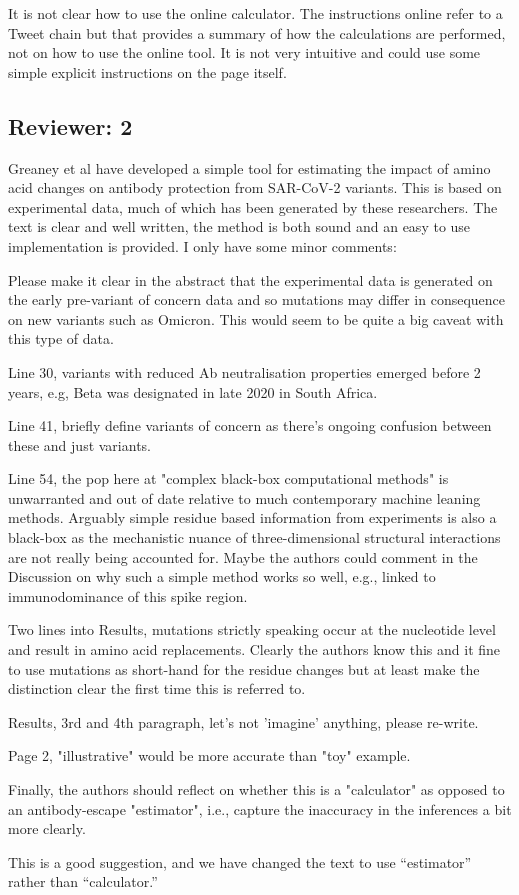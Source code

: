 \documentclass[11pt, oneside]{article}   	%
\newcommand{\response}[1]{{\color{black}#1}}
\begin{document}
It is not clear how to use the online calculator.  The instructions online refer to a Tweet chain but that provides a summary of how the calculations are performed, not on how to use the online tool.  It is not very intuitive and could use some simple explicit instructions on the page itself.

\subsection*{Reviewer: 2}

Greaney et al have developed a simple tool for estimating the impact of amino acid changes on antibody protection from SAR-CoV-2 variants. This is based on experimental data, much of which has been generated by these researchers. The text is clear and well written, the method is both sound and an easy to use implementation is provided. I only have some minor comments:

Please make it clear in the abstract that the experimental data is generated on the early pre-variant of concern data and so mutations may differ in consequence on new variants such as Omicron. This would seem to be quite a big caveat with this type of data.

Line 30, variants with reduced Ab neutralisation properties emerged before 2 years, e.g, Beta was designated in late 2020 in South Africa.

Line 41, briefly define variants of concern as there's ongoing confusion between these and just variants.

Line 54, the pop here at "complex black-box computational methods" is unwarranted and out of date relative to much contemporary machine leaning methods. Arguably simple residue based information from experiments is also a black-box as the mechanistic nuance of three-dimensional structural interactions are not really being accounted for. Maybe the authors could comment in the Discussion on why such a simple method works so well, e.g., linked to immunodominance of this spike region.

Two lines into Results, mutations strictly speaking occur at the nucleotide level and result in amino acid replacements. Clearly the authors know this and it fine to use mutations as short-hand for the residue changes but at least make the distinction clear the first time this is referred to.

Results, 3rd and 4th paragraph, let's not 'imagine' anything, please re-write.

Page 2, "illustrative" would be more accurate than "toy" example.

Finally, the authors should reflect on whether this is a "calculator" as opposed to an antibody-escape "estimator", i.e., capture the inaccuracy in the inferences a bit more clearly.

\response{This is a good suggestion, and we have changed the text to use ``estimator'' rather than ``calculator.''}

\color{black}

{\small

}
\end{document}
